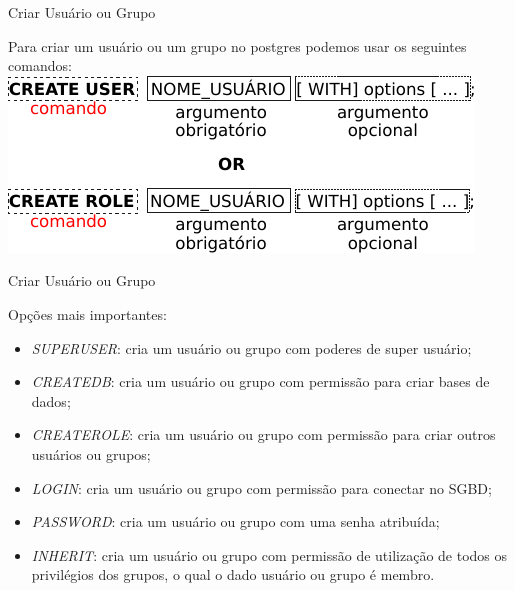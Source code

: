 \documentclass[xcolor=x11names,compress]{beamer}
\begin{document}
\begin{frame}{Criar Usuário ou Grupo}

Para criar um usuário ou um grupo no postgres podemos usar os seguintes comandos:\\[5mm]

\centering \includegraphics[keepaspectratio,width=\textwidth]{create_user}

\end{frame}

\begin{frame}[allowframebreaks]{Criar Usuário ou Grupo}

Opções mais importantes:

\begin{itemize}

\itemsep 5mm

\item \textit{SUPERUSER}: cria um usuário ou grupo com poderes de super usuário;

\item \textit{CREATEDB}: cria um usuário ou grupo com permissão para criar bases de dados;

\item \textit{CREATEROLE}: cria um usuário ou grupo com permissão para criar outros usuários ou grupos;

\item \textit{LOGIN}: cria um usuário ou grupo com permissão para conectar no SGBD;

\item \textit{PASSWORD}: cria um usuário ou grupo com uma senha atribuída;

\item \textit{INHERIT}: cria um usuário ou grupo com permissão de utilização de todos os privilégios dos grupos, o qual o dado usuário ou grupo é membro.

\end{itemize}

\end{frame}
\end{document}
